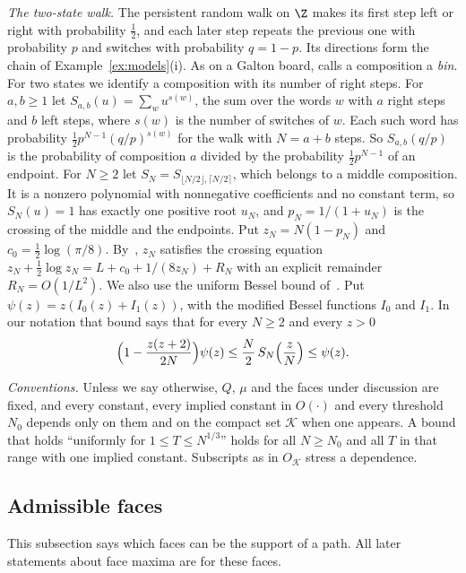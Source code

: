 \emph{The two-state walk.} The persistent random walk on $\Z$ makes its first
step left or right with probability $\frac12$, and each later step repeats the
previous one with probability $p$ and switches with probability $q=1-p$. Its
directions form the chain of Example~\ref{ex:models}(i). As on a Galton board,
\cite{paperA} calls a composition a \emph{bin}. For two states we identify a composition
with its number of right steps. For $a,b\ge1$ let
$S_{a,b}(u)=\sum_wu^{s(w)}$, the sum
over the words $w$ with $a$ right steps and $b$ left steps, where $s(w)$ is the
number of switches of $w$. Each such word has probability
$\frac12p^{N-1}(q/p)^{s(w)}$ for the walk with $N=a+b$ steps. So
$S_{a,b}(q/p)$ is the probability of composition $a$ divided by the probability
$\frac12p^{N-1}$ of an endpoint. For $N\ge2$ let
$S_N=S_{\lfloor N/2\rfloor,\lceil N/2\rceil}$, which belongs to a middle composition.
It is a nonzero polynomial with nonnegative coefficients
and no constant term, so $S_N(u)=1$ has exactly one positive root $u_N$, and
$p_N=1/(1+u_N)$ is the crossing of the middle and the endpoints. Put
$z_N=N(1-p_N)$ and $c_0=\frac12\log(\pi/8)$. By~\cite{paperA}, $z_N$ satisfies
the crossing equation $z_N+\frac12\log z_N=L+c_0+1/(8z_N)+R_N$ with an explicit
remainder $R_N=O(1/L^2)$. We also use the uniform Bessel bound
of~\cite[Theorem~3.3(i)]{paperA}. Put $\psi(z)=z(I_0(z)+I_1(z))$, with the modified Bessel
functions $I_0$ and $I_1$. In our notation that bound says
that for every $N\ge2$ and every $z>0$
\begin{equation}\label{eq:planar-bessel}
 \Bigl(1-\frac{z(z+2)}{2N}\Bigr)\psi(z)\le\frac N2\,S_N\Bigl(\frac zN\Bigr)\le\psi(z).
\end{equation}

\emph{Conventions.} Unless we say otherwise, $Q$, $\mu$ and the faces under
discussion are fixed, and every constant, every implied constant in $O(\cdot)$
and every threshold $N_0$ depends only on them and on the compact set
$\mathcal K$ when one appears. A bound that holds ``uniformly for $1\le T\le
N^{1/3}$'' holds for all $N\ge N_0$ and all $T$ in that range with one implied
constant. Subscripts as in $O_{\mathcal K}$ stress a dependence.

\subsection{Admissible faces}

This subsection says which faces can be the support of a path. All later statements about face
maxima are for these faces.

